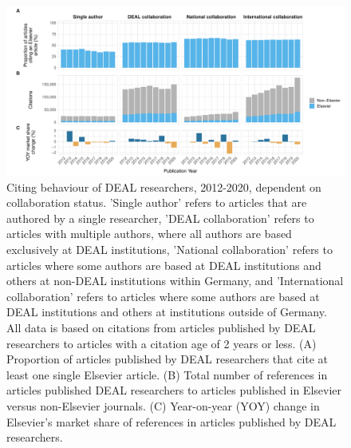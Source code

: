 \documentclass[
]{article}
\begin{document}
\begin{figure}

{\centering \includegraphics{analysis_files/figure-latex/references-publisher-year-collaboration-1} 

}

\caption{Citing behaviour of DEAL researchers, 2012-2020, dependent on collaboration status. 'Single author' refers to articles that are authored by a single researcher, 'DEAL collaboration' refers to articles with multiple authors, where all authors are based exclusively at DEAL institutions, 'National collaboration' refers to articles where some authors are based at DEAL institutions and others at non-DEAL institutions within Germany, and 'International collaboration' refers to articles where some authors are based at DEAL institutions and others at institutions outside of Germany. All data is based on citations from articles published by DEAL researchers to articles with a citation age of 2 years or less. (A) Proportion of articles published by DEAL researchers that cite at least one single Elsevier article. (B) Total number of references in articles published DEAL researchers to articles published in Elsevier versus non-Elsevier journals. (C) Year-on-year (YOY) change in Elsevier's market share of references in articles published by DEAL researchers.}\label{fig:references-publisher-year-collaboration}
\end{figure}
\end{document}

